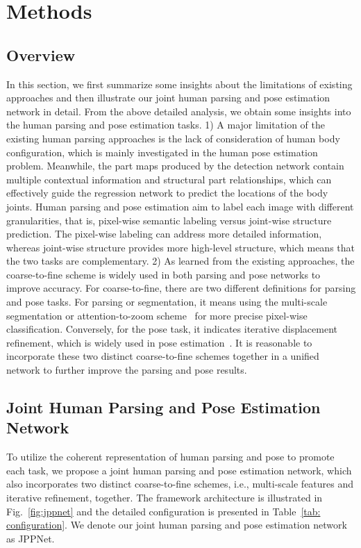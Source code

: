 \documentclass[10pt,journal,compsoc]{IEEEtran}
\begin{document}
\section{Methods}
\subsection{Overview}
{In this section, we first summarize some insights about the limitations of existing approaches and then illustrate our joint human parsing and pose estimation network in detail.}
From the above detailed analysis, we obtain some insights into the human parsing and pose estimation tasks. 1) A major limitation of the existing human parsing approaches is the lack of consideration of human body configuration, which is mainly investigated in the human pose estimation problem. Meanwhile, the part maps produced by the detection network contain multiple contextual information and structural part relationships, which can effectively guide the regression network to predict the locations of the body joints. Human parsing and pose estimation aim to label each image with different granularities, that is, pixel-wise semantic labeling versus joint-wise structure prediction. The pixel-wise labeling can address more detailed information, whereas joint-wise structure provides more high-level structure, which means that the two tasks are complementary. 2) As learned from the existing approaches, the coarse-to-fine scheme is widely used in both parsing and pose networks to improve accuracy. For coarse-to-fine, there are two different definitions for parsing and pose tasks. For parsing or segmentation, it means using the multi-scale segmentation or attention-to-zoom scheme~\cite{chen2015attention} for more precise pixel-wise classification. Conversely, for the pose task, it indicates iterative displacement refinement, which is widely used in pose estimation~\cite{Wei_2016_CVPR}. It is reasonable to incorporate these two distinct coarse-to-fine schemes together in a unified network to further improve the parsing and pose results.


\subsection{Joint Human Parsing and Pose Estimation Network}
To utilize the coherent representation of human parsing and pose to promote each task, we propose a joint human parsing and pose estimation network, which also incorporates two distinct coarse-to-fine schemes, i.e., multi-scale features and iterative refinement, together. The framework architecture is illustrated in Fig.~\ref{fig:jppnet} and the detailed configuration is presented in Table~\ref{tab: configuration}. We denote our joint human parsing and pose estimation network as JPPNet.
\end{document}
